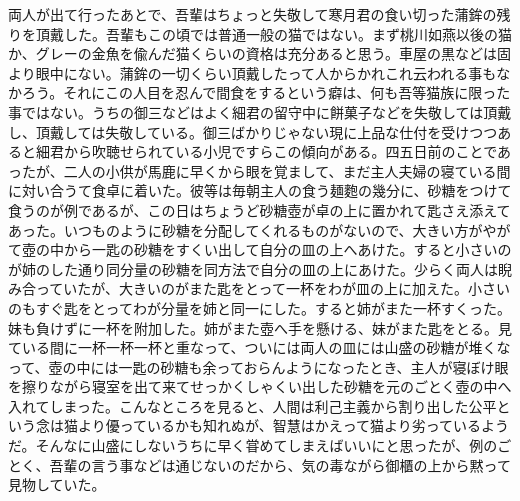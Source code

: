 \documentclass[12pt, openright]{book}
\begin{document}
両人が出て行ったあとで、吾輩はちょっと失敬して寒月君の食い切った蒲鉾の残りを頂戴した。吾輩もこの頃では普通一般の猫ではない。まず桃川如燕以後の猫か、グレーの金魚を偸んだ猫くらいの資格は充分あると思う。車屋の黒などは固より眼中にない。蒲鉾の一切くらい頂戴したって人からかれこれ云われる事もなかろう。それにこの人目を忍んで間食をするという癖は、何も吾等猫族に限った事ではない。うちの御三などはよく細君の留守中に餅菓子などを失敬しては頂戴し、頂戴しては失敬している。御三ばかりじゃない現に上品な仕付を受けつつあると細君から吹聴せられている小児ですらこの傾向がある。四五日前のことであったが、二人の小供が馬鹿に早くから眼を覚まして、まだ主人夫婦の寝ている間に対い合うて食卓に着いた。彼等は毎朝主人の食う麺麭の幾分に、砂糖をつけて食うのが例であるが、この日はちょうど砂糖壺が卓の上に置かれて匙さえ添えてあった。いつものように砂糖を分配してくれるものがないので、大きい方がやがて壺の中から一匙の砂糖をすくい出して自分の皿の上へあけた。すると小さいのが姉のした通り同分量の砂糖を同方法で自分の皿の上にあけた。少らく両人は睨み合っていたが、大きいのがまた匙をとって一杯をわが皿の上に加えた。小さいのもすぐ匙をとってわが分量を姉と同一にした。すると姉がまた一杯すくった。妹も負けずに一杯を附加した。姉がまた壺へ手を懸ける、妹がまた匙をとる。見ている間に一杯一杯一杯と重なって、ついには両人の皿には山盛の砂糖が堆くなって、壺の中には一匙の砂糖も余っておらんようになったとき、主人が寝ぼけ眼を擦りながら寝室を出て来てせっかくしゃくい出した砂糖を元のごとく壺の中へ入れてしまった。こんなところを見ると、人間は利己主義から割り出した公平という念は猫より優っているかも知れぬが、智慧はかえって猫より劣っているようだ。そんなに山盛にしないうちに早く甞めてしまえばいいにと思ったが、例のごとく、吾輩の言う事などは通じないのだから、気の毒ながら御櫃の上から黙って見物していた。
\end{document}
